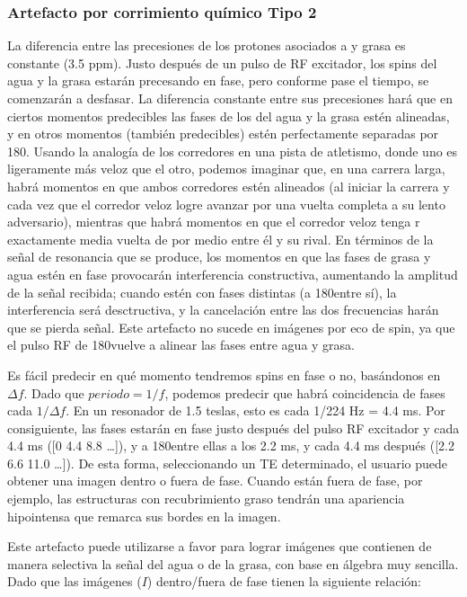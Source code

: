 \subsubsection{Artefacto por corrimiento químico Tipo 2}
La diferencia entre las precesiones de los protones asociados a  y grasa es constante (3.5 ppm). Justo después de un pulso de RF excitador, los spins del agua y la grasa estarán precesando en fase, pero conforme pase el tiempo, se comenzarán a desfasar. La diferencia constante entre sus precesiones hará que en ciertos momentos predecibles las fases de los  del agua y la grasa estén alineadas, y en otros momentos (también predecibles) estén perfectamente separadas por 180\degrees. Usando la analogía de los corredores en una pista de atletismo, donde uno es ligeramente más veloz que el otro, podemos imaginar que, en una carrera larga, habrá momentos en que ambos corredores estén alineados (al iniciar la carrera y cada vez que el corredor veloz logre avanzar por una vuelta completa a su lento adversario), mientras que habrá momentos en que el corredor veloz tenga r exactamente media vuelta de por medio entre él y su rival. En términos de la señal de resonancia que se produce, los momentos en que las fases de grasa y agua estén en fase provocarán interferencia constructiva, aumentando la amplitud de la señal recibida; cuando estén con fases distintas (a 180\degrees entre sí), la interferencia será desctructiva, y la cancelación entre las dos frecuencias harán que se pierda señal. Este artefacto no sucede en imágenes por eco de spin, ya que el pulso RF de 180\degrees vuelve a alinear las fases entre agua y grasa. 


Es fácil predecir en qué momento tendremos spins en fase o no, basándonos en $\Delta f$. Dado que $periodo = 1/f$, podemos predecir que habrá coincidencia de fases cada $1/\Delta f$. En un resonador de 1.5 teslas, esto es cada 1/224 Hz =  4.4 ms. Por consiguiente, las fases estarán en fase justo después del pulso RF excitador y cada 4.4 ms ([0 4.4 8.8 \ldots]), y a 180\degrees entre ellas a los 2.2 ms, y cada 4.4 ms después ([2.2 6.6 11.0 \ldots]). De esta forma, seleccionando un TE determinado, el usuario puede obtener una imagen dentro o fuera de fase. Cuando están fuera de fase, por ejemplo, las estructuras con recubrimiento graso tendrán una apariencia hipointensa que remarca sus bordes en la imagen.

Este artefacto puede utilizarse a favor para lograr imágenes que contienen de manera selectiva la señal del agua o de la grasa, con base en álgebra muy sencilla. Dado que las imágenes ($I$) dentro/fuera de fase tienen la siguiente relación:

